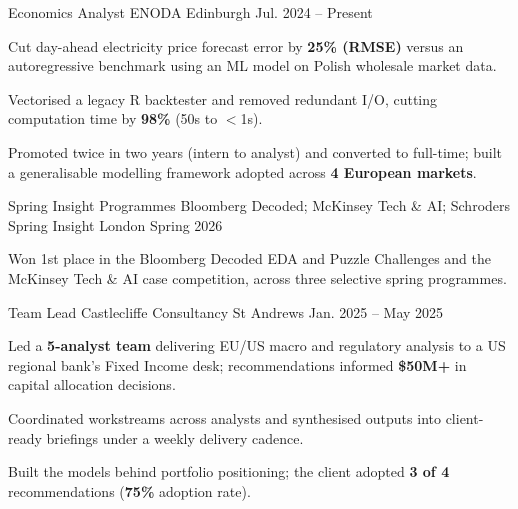 

\begin{cventries}

  \cventry
    {Economics Analyst} %
    {ENODA} %
    {Edinburgh} %
    {Jul. 2024 -- Present} %
    {
      \begin{cvitems}
        \item {Cut day-ahead electricity price forecast error by \textbf{25\% (RMSE)} versus an autoregressive benchmark using an ML model on Polish wholesale market data.}
        \item {Vectorised a legacy R backtester and removed redundant I/O, cutting computation time by \textbf{98\%} (50s to $<$1s).}
        \item {Promoted twice in two years (intern to analyst) and converted to full-time; built a generalisable modelling framework adopted across \textbf{4 European markets}.}
      \end{cvitems}
    }

  \cventry
    {Spring Insight Programmes} %
    {Bloomberg Decoded; McKinsey Tech \& AI; Schroders Spring Insight} %
    {London} %
    {Spring 2026} %
    {
      \begin{cvitems}
        \item {Won 1st place in the Bloomberg Decoded EDA and Puzzle Challenges and the McKinsey Tech \& AI case competition, across three selective spring programmes.}
      \end{cvitems}
    }

  \cventry
    {Team Lead} %
    {Castlecliffe Consultancy} %
    {St Andrews} %
    {Jan. 2025 -- May 2025} %
    {
      \begin{cvitems}
        \item {Led a \textbf{5-analyst team} delivering EU/US macro and regulatory analysis to a US regional bank's Fixed Income desk; recommendations informed \textbf{\$50M+} in capital allocation decisions.}
        \item {Coordinated workstreams across analysts and synthesised outputs into client-ready briefings under a weekly delivery cadence.}
        \item {Built the models behind portfolio positioning; the client adopted \textbf{3 of 4} recommendations (\textbf{75\%} adoption rate).}
      \end{cvitems}
    }


\end{cventries}
